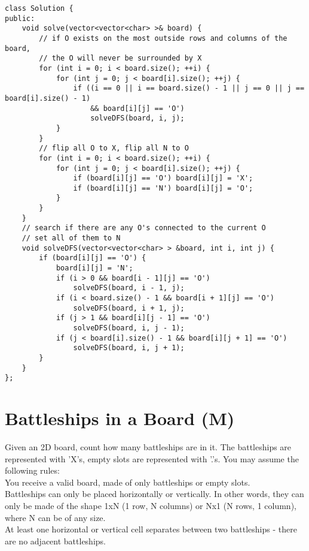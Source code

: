 \begin{lstlisting}
class Solution {
public:
    void solve(vector<vector<char> >& board) {
        // if O exists on the most outside rows and columns of the board,
        // the O will never be surrounded by X
        for (int i = 0; i < board.size(); ++i) {
            for (int j = 0; j < board[i].size(); ++j) {
                if ((i == 0 || i == board.size() - 1 || j == 0 || j == board[i].size() - 1) 
                    && board[i][j] == 'O')
                    solveDFS(board, i, j);
            }
        }
        // flip all O to X, flip all N to O
        for (int i = 0; i < board.size(); ++i) {
            for (int j = 0; j < board[i].size(); ++j) {
                if (board[i][j] == 'O') board[i][j] = 'X';
                if (board[i][j] == 'N') board[i][j] = 'O';
            }
        }
    }
    // search if there are any O's connected to the current O
    // set all of them to N
    void solveDFS(vector<vector<char> > &board, int i, int j) {
        if (board[i][j] == 'O') {
            board[i][j] = 'N';
            if (i > 0 && board[i - 1][j] == 'O') 
                solveDFS(board, i - 1, j);
            if (i < board.size() - 1 && board[i + 1][j] == 'O') 
                solveDFS(board, i + 1, j);
            if (j > 1 && board[i][j - 1] == 'O') 
                solveDFS(board, i, j - 1);
            if (j < board[i].size() - 1 && board[i][j + 1] == 'O') 
                solveDFS(board, i, j + 1);
        }
    }
};
\end{lstlisting}

\section{Battleships in a Board (M)}
Given an 2D board, count how many battleships are in it. The battleships are represented with 'X's, empty slots are represented with '.'s. You may assume the following rules:\\

    You receive a valid board, made of only battleships or empty slots.\\
    Battleships can only be placed horizontally or vertically. In other words, they can only be made of the shape 1xN (1 row, N columns) or Nx1 (N rows, 1 column), where N can be of any size.\\
    At least one horizontal or vertical cell separates between two battleships - there are no adjacent battleships.\\
    
